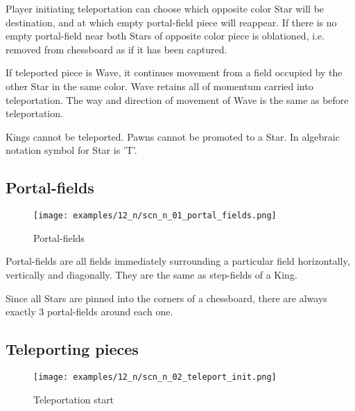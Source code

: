 Player initiating teleportation can choose which opposite color Star will be destination,
and at which empty portal-field piece will reappear. If there is no empty portal-field near
both Stars of opposite color piece is oblationed, i.e. removed from chessboard as if it has
been captured.

If teleported piece is Wave, it continues movement from a field occupied by the other Star in
the same color. Wave retains all of momentum carried into teleportation. The way and direction
of movement of Wave is the same as before teleportation.

Kings cannot be teleported.
Pawns cannot be promoted to a Star.
In algebraic notation symbol for Star is 'T'.

\clearpage %

\subsection*{Portal-fields}

\noindent
\begin{figure}[!h]
\texttt{[image: examples/12\_n/scn\_n\_01\_portal\_fields.png]}
\caption{Portal-fields}
\label{fig:scn_n_01_portal_fields}
\end{figure}

Portal-fields are all fields immediately surrounding a particular field
horizontally, vertically and diagonally. They are the same as step-fields
of a King.

Since all Stars are pinned into the corners of a chessboard, there are always
exactly 3 portal-fields around each one.

\clearpage %

\subsection*{Teleporting pieces}

\noindent
\begin{figure}[!h]
\texttt{[image: examples/12\_n/scn\_n\_02\_teleport\_init.png]}
\caption{Teleportation start}
\label{fig:scn_n_02_teleport_init}
\end{figure}

